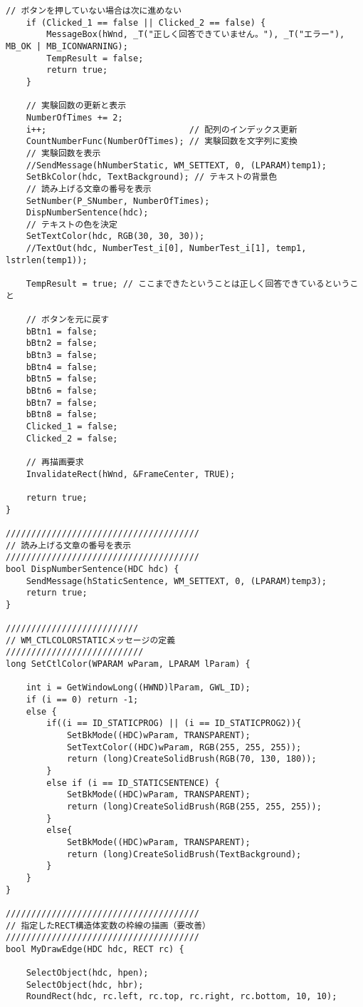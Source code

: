 \begin{lstlisting}[caption=main.cpp]
	// ボタンを押していない場合は次に進めない
	if (Clicked_1 == false || Clicked_2 == false) {
		MessageBox(hWnd, _T("正しく回答できていません。"), _T("エラー"), MB_OK | MB_ICONWARNING);
		TempResult = false;
		return true;
	}

	// 実験回数の更新と表示
	NumberOfTimes += 2;
	i++;                            // 配列のインデックス更新
	CountNumberFunc(NumberOfTimes); // 実験回数を文字列に変換
	// 実験回数を表示
	//SendMessage(hNumberStatic, WM_SETTEXT, 0, (LPARAM)temp1);
	SetBkColor(hdc, TextBackground); // テキストの背景色
	// 読み上げる文章の番号を表示
	SetNumber(P_SNumber, NumberOfTimes);
	DispNumberSentence(hdc);
	// テキストの色を決定
	SetTextColor(hdc, RGB(30, 30, 30));
	//TextOut(hdc, NumberTest_i[0], NumberTest_i[1], temp1, lstrlen(temp1));
	
	TempResult = true; // ここまできたということは正しく回答できているということ

    // ボタンを元に戻す
	bBtn1 = false;
	bBtn2 = false;
	bBtn3 = false;
	bBtn4 = false;
	bBtn5 = false;
	bBtn6 = false;
	bBtn7 = false;
	bBtn8 = false;
	Clicked_1 = false;
	Clicked_2 = false;

	// 再描画要求
	InvalidateRect(hWnd, &FrameCenter, TRUE);

	return true;
}

//////////////////////////////////////
// 読み上げる文章の番号を表示
//////////////////////////////////////
bool DispNumberSentence(HDC hdc) {
	SendMessage(hStaticSentence, WM_SETTEXT, 0, (LPARAM)temp3);
	return true;
}

//////////////////////////
// WM_CTLCOLORSTATICメッセージの定義
///////////////////////////
long SetCtlColor(WPARAM wParam, LPARAM lParam) {

	int i = GetWindowLong((HWND)lParam, GWL_ID);
	if (i == 0) return -1;
	else {
		if((i == ID_STATICPROG) || (i == ID_STATICPROG2)){
			SetBkMode((HDC)wParam, TRANSPARENT);
			SetTextColor((HDC)wParam, RGB(255, 255, 255));
			return (long)CreateSolidBrush(RGB(70, 130, 180));
		}
		else if (i == ID_STATICSENTENCE) {
			SetBkMode((HDC)wParam, TRANSPARENT);
			return (long)CreateSolidBrush(RGB(255, 255, 255));
		}
		else{
			SetBkMode((HDC)wParam, TRANSPARENT);
			return (long)CreateSolidBrush(TextBackground);
		}	
	}
}

//////////////////////////////////////
// 指定したRECT構造体変数の枠線の描画（要改善）
//////////////////////////////////////
bool MyDrawEdge(HDC hdc, RECT rc) {
	
	SelectObject(hdc, hpen);
	SelectObject(hdc, hbr);
	RoundRect(hdc, rc.left, rc.top, rc.right, rc.bottom, 10, 10);
	


\end{lstlisting}
